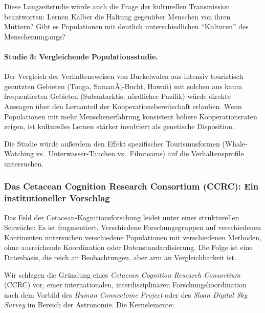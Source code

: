 ﻿\documentclass[12pt,a4paper]{article}
\theoremstyle{definition}
\theoremstyle{remark}
\begin{document}
Diese Langzeitstudie würde auch die Frage der kulturellen Transmission beantworten: Lernen Kälber die Haltung gegenüber Menschen von ihren Müttern? Gibt es Populationen mit deutlich unterschiedlichen ``Kulturen'' des Menschenumgangs?

\paragraph{Studie 3: Vergleichende Populationsstudie.}
Der Vergleich der Verhaltensweisen von Buckelwalen aus intensiv touristisch genutzten Gebieten (Tonga, SamanÃ¡-Bucht, Hawaii) mit solchen aus kaum frequentierten Gebieten (Subantarktis, nördlicher Pazifik) würde direkte Aussagen über den Lernanteil der Kooperationsbereitschaft erlauben. Wenn Populationen mit mehr Menschenerfahrung konsistent höhere Kooperationsraten zeigen, ist kulturelles Lernen stärker involviert als genetische Disposition.

Die Studie würde außerdem den Effekt spezifischer Tourismusformen (Whale-Watching vs.\ Unterwasser-Tauchen vs.\ Filmteams) auf die Verhaltensprofile untersuchen.

\subsubsection{Das Cetacean Cognition Research Consortium (CCRC): Ein institutioneller Vorschlag}

Das Feld der Cetacean-Kognitionsforschung leidet unter einer strukturellen Schwäche: Es ist fragmentiert. Verschiedene Forschungsgruppen auf verschiedenen Kontinenten untersuchen verschiedene Populationen mit verschiedenen Methoden, ohne ausreichende Koordination oder Datenstandardisierung. Die Folge ist eine Datenbasis, die reich an Beobachtungen, aber arm an Vergleichbarkeit ist.

Wir schlagen die Gründung eines \emph{Cetacean Cognition Research Consortium} (CCRC) vor, einer internationalen, interdisziplinären Forschungskoordination nach dem Vorbild des \emph{Human Connectome Project} oder des \emph{Sloan Digital Sky Survey} im Bereich der Astronomie. Die Kernelemente:
\end{document}
